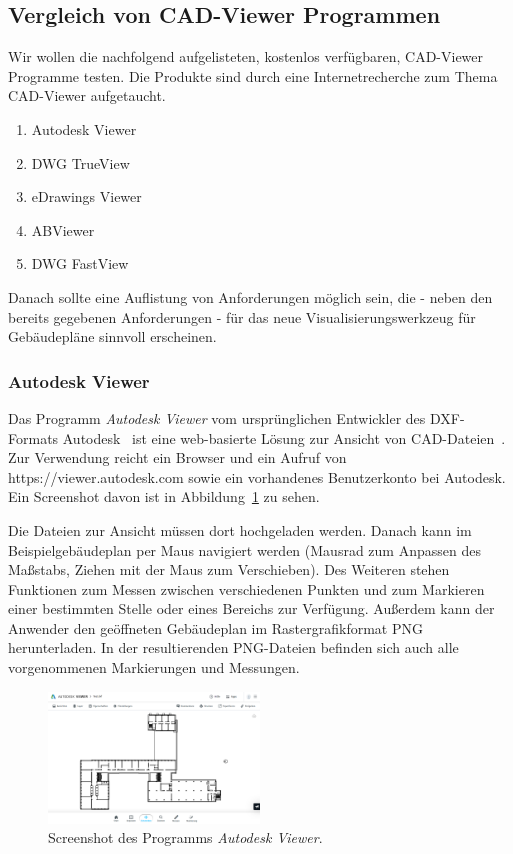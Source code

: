 \subsection{Vergleich von CAD-Viewer Programmen}
\label{subsec:comparison-cad-viewer}

Wir wollen die nachfolgend aufgelisteten, kostenlos verfügbaren, CAD-Viewer Programme testen.
Die Produkte sind durch eine Internetrecherche zum Thema CAD-Viewer aufgetaucht.

\begin{enumerate}
    \item Autodesk Viewer
    \item DWG TrueView
    \item eDrawings Viewer
    \item ABViewer
    \item DWG FastView
\end{enumerate}

Danach sollte eine Auflistung von Anforderungen möglich sein, die - neben den bereits gegebenen Anforderungen - für das neue Visualisierungswerkzeug für Gebäudepläne sinnvoll erscheinen.

\subsubsection{Autodesk Viewer}
\label{subsubsec:autodesk-viewer}

Das Programm \textit{Autodesk Viewer} vom ursprünglichen Entwickler des DXF-Formats Autodesk~\cite{DXFReference} ist eine web-basierte Lösung zur Ansicht von CAD-Dateien~\cite{AutodeskViewer}.
Zur Verwendung reicht ein Browser und ein Aufruf von https://viewer.autodesk.com sowie ein vorhandenes Benutzerkonto bei Autodesk.
Ein Screenshot davon ist in Abbildung~\ref{fig:autodesk-viewer} zu sehen.

Die Dateien zur Ansicht müssen dort hochgeladen werden.
Danach kann im Beispielgebäudeplan per Maus navigiert werden (Mausrad zum Anpassen des Maßstabs, Ziehen mit der Maus zum Verschieben).
Des Weiteren stehen Funktionen zum Messen zwischen verschiedenen Punkten und zum Markieren einer bestimmten Stelle oder eines Bereichs zur Verfügung.
Außerdem kann der Anwender den geöffneten Gebäudeplan im Rastergrafikformat PNG herunterladen.
In der resultierenden PNG-Dateien befinden sich auch alle vorgenommenen Markierungen und Messungen.

\begin{figure}
    \includegraphics[width=0.5\textwidth]{res/autodesk-viewer.png}
    \caption{Screenshot des Programms \textit{Autodesk Viewer}.}
    \label{fig:autodesk-viewer}
\end{figure}
